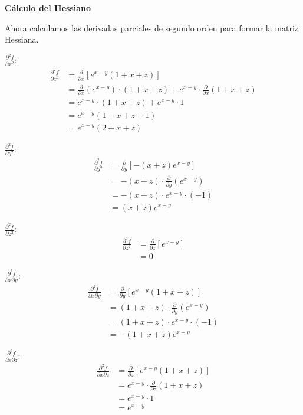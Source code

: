 \documentclass{article}
\begin{document}
\textbf{Cálculo del Hessiano}

Ahora calculamos las derivadas parciales de segundo orden para formar la matriz Hessiana.

$\frac{\partial^2 f}{\partial x^2}$:
\begin{align}
\frac{\partial^2 f}{\partial x^2} &= \frac{\partial}{\partial x}[e^{x-y}(1 + x + z)] \\
&= \frac{\partial}{\partial x}(e^{x-y}) \cdot (1 + x + z) + e^{x-y} \cdot \frac{\partial}{\partial x}(1 + x + z) \\
&= e^{x-y} \cdot (1 + x + z) + e^{x-y} \cdot 1 \\
&= e^{x-y}(1 + x + z + 1) \\
&= e^{x-y}(2 + x + z)
\end{align}

$\frac{\partial^2 f}{\partial y^2}$:
\begin{align}
\frac{\partial^2 f}{\partial y^2} &= \frac{\partial}{\partial y}[-(x + z)e^{x-y}] \\
&= -(x + z) \cdot \frac{\partial}{\partial y}(e^{x-y}) \\
&= -(x + z) \cdot e^{x-y} \cdot (-1) \\
&= (x + z)e^{x-y}
\end{align}

$\frac{\partial^2 f}{\partial z^2}$:
\begin{align}
\frac{\partial^2 f}{\partial z^2} &= \frac{\partial}{\partial z}[e^{x-y}] \\
&= 0
\end{align}

$\frac{\partial^2 f}{\partial x \partial y}$:
\begin{align}
\frac{\partial^2 f}{\partial x \partial y} &= \frac{\partial}{\partial y}[e^{x-y}(1 + x + z)] \\
&= (1 + x + z) \cdot \frac{\partial}{\partial y}(e^{x-y}) \\
&= (1 + x + z) \cdot e^{x-y} \cdot (-1) \\
&= -(1 + x + z)e^{x-y}
\end{align}

$\frac{\partial^2 f}{\partial x \partial z}$:
\begin{align}
\frac{\partial^2 f}{\partial x \partial z} &= \frac{\partial}{\partial z}[e^{x-y}(1 + x + z)] \\
&= e^{x-y} \cdot \frac{\partial}{\partial z}(1 + x + z) \\
&= e^{x-y} \cdot 1 \\
&= e^{x-y}
\end{align}
\end{document}
